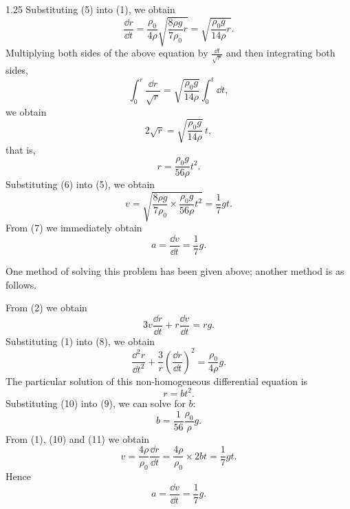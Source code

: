 \begin{solution}{1.25}
Substituting (5) into (1), we obtain
\begin{equation*}
\frac{\dd r}{\dd t}=\frac{\rho_0}{4\rho}\sqrt{\frac{8\rho g}{7\rho_0}r}
=\sqrt{\frac{\rho_0 g}{14\rho}r}.
\end{equation*}
Multiplying both sides of the above equation by $\frac{\dd t}{\sqrt r}$ and then integrating
both sides,
\begin{equation*}
\int_0^r\frac{\dd r}{\sqrt r}=\sqrt{\frac{\rho_0 g}{14\rho}}\int_0^t\dd t,
\end{equation*}
we obtain
\begin{equation*}
2\sqrt r=\sqrt{\frac{\rho_0 g}{14\rho}}\,t,
\end{equation*}
that is,
\begin{equation}
r=\frac{\rho_0 g}{56\rho}t^2. \tag{6}
\end{equation}
Substituting (6) into (5), we obtain
\begin{equation}
v=\sqrt{\frac{8\rho g}{7\rho_0}\times\frac{\rho_0 g}{56\rho}t^2}=\frac{1}{7}gt. \tag{7}
\end{equation}
From (7) we immediately obtain
\begin{equation*}
a=\frac{\dd v}{\dd t}=\frac{1}{7}g.
\end{equation*}

One method of solving this problem has been given above; another method is as follows.

From (2) we obtain
\begin{equation}
3v\frac{\dd r}{\dd t}+r\frac{\dd v}{\dd t}=rg. \tag{8}
\end{equation}
Substituting (1) into (8), we obtain
\begin{equation}
\frac{\dd^2r}{\dd t^2}+\frac{3}{r}\left(\frac{\dd r}{\dd t}\right)^2=\frac{\rho_0}{4\rho}g. \tag{9}
\end{equation}
The particular solution of this non-homogeneous differential equation is
\begin{equation}
r=bt^2. \tag{10}
\end{equation}
Substituting (10) into (9), we can solve for $b$:
\begin{equation}
b=\frac{1}{56}\frac{\rho_0}{\rho}g. \tag{11}
\end{equation}
From (1), (10) and (11) we obtain
\begin{equation}
v=\frac{4\rho}{\rho_0}\frac{\dd r}{\dd t}
=\frac{4\rho}{\rho_0}\times 2bt=\frac{1}{7}gt. \tag{12}
\end{equation}
Hence
\begin{equation*}
a=\frac{\dd v}{\dd t}=\frac{1}{7}g.
\end{equation*}
\end{solution}

